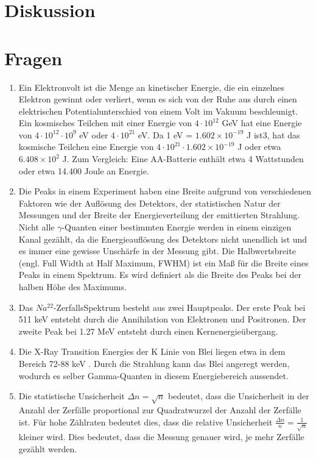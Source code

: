 \documentclass[11pt, a4paper]{article}
\begin{document}
    \section{Diskussion}
    \section{Fragen}
    \begin{enumerate}
        \item Ein Elektronvolt ist die Menge an kinetischer Energie, die ein einzelnes Elektron gewinnt oder verliert, wenn es sich von der Ruhe aus durch einen elektrischen Potentialunterschied von einem Volt im Vakuum beschleunigt.
        Ein kosmisches Teilchen mit einer Energie von $4 \cdot 10^{12}$ GeV hat eine Energie von $4 \cdot 10^{12} \cdot 10^9$ eV oder $4 \cdot 10^{21}$ eV. Da 1 eV = $1.602 \times 10^{-19}$ J ist3, hat das kosmische Teilchen eine Energie von $4 \cdot 10^{21} \cdot 1.602 \times 10^{-19}$ J oder etwa $6.408 \times 10^2$ J.        
        Zum Vergleich: Eine AA-Batterie enthält etwa 4 Wattstunden oder etwa 14.400 Joule an Energie.
        \item Die Peaks in einem Experiment haben eine Breite aufgrund von verschiedenen Faktoren wie der Auflösung des Detektors, der statistischen Natur der Messungen und der Breite der Energieverteilung der emittierten Strahlung.
        Nicht alle $\gamma$-Quanten einer bestimmten Energie werden in einem einzigen Kanal gezählt, da die Energieauflösung des Detektors nicht unendlich ist und es immer eine gewisse Unschärfe in der Messung gibt.
        Die Halbwertsbreite (engl. Full Width at Half Maximum, FWHM) ist ein Maß für die Breite eines Peaks in einem Spektrum. Es wird definiert als die Breite des Peaks bei der halben Höhe des Maximums.
        \item Das $Na^{22}$-ZerfallsSpektrum besteht aus zwei Hauptpeaks. Der erste Peak bei 511 keV entsteht durch die Annihilation von Elektronen und Positronen. Der zweite Peak bei 1.27 MeV entsteht durch einen Kernenergieübergang.
        \item Die X-Ray Transition Energies der K Linie von Blei liegen etwa in dem Bereich 72-88 keV \cite{blei}. Durch die Strahlung kann das Blei angeregt werden, wodurch es selber Gamma-Quanten in diesem Energiebereich aussendet.
        \item Die statistische Unsicherheit $\Delta n = \sqrt{n}$ bedeutet, dass die Unsicherheit in der Anzahl der Zerfälle proportional zur Quadratwurzel der Anzahl der Zerfälle ist. Für hohe Zählraten bedeutet dies, dass die relative Unsicherheit $\frac{\Delta n}{n} = \frac{1}{\sqrt{n}}$ kleiner wird. Dies bedeutet, dass die Messung genauer wird, je mehr Zerfälle gezählt werden.

\end{enumerate}
\end{document}
